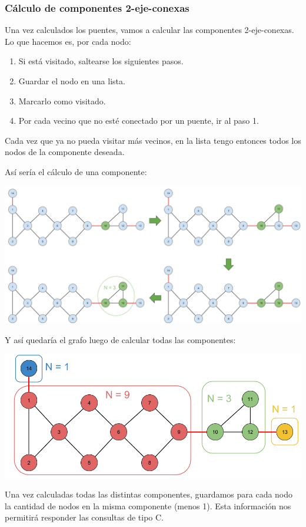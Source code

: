 \subsubsection{Cálculo de componentes 2-eje-conexas}
\noindent
Una vez calculados los puentes, vamos a calcular las componentes 2-eje-conexas. Lo que hacemos es, por cada nodo:
\begin{enumerate}
\item Si está visitado, saltearse los siguientes pasos.
\item Guardar el nodo en una lista.
\item Marcarlo como visitado.
\item Por cada vecino que no esté conectado por un puente, ir al paso 1.
\end{enumerate}

\noindent
Cada vez que ya no pueda visitar más vecinos, en la lista tengo entonces todos los nodos de la componente deseada.

\hfill \break \noindent
Así sería el cálculo de una componente:

\includegraphics[scale=0.2]{Imagenes/Imagen3}

\hfill \break \noindent
Y así quedaría el grafo luego de calcular todas las componentes:

\hfill \break 
\includegraphics[scale=0.4]{Imagenes/Imagen4}

\noindent
Una vez calculadas todas las distintas componentes, guardamos para cada nodo la cantidad de nodos en la misma componente (menos 1). Esta información nos permitirá responder las consultas de tipo C. 

